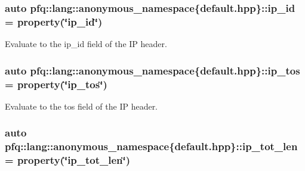 \subsubsection[{\texorpdfstring{ip\+\_\+id}{ip_id}}]{\setlength{\rightskip}{0pt plus 5cm}auto pfq\+::lang\+::anonymous\+\_\+namespace\{default.\+hpp\}\+::ip\+\_\+id = {\bf property}(\char`\"{}ip\+\_\+id\char`\"{})}\hypertarget{namespacepfq_1_1lang_1_1anonymous__namespace_02default_8hpp_03_a87620275a9e9760978d5660be0582852}{}\label{namespacepfq_1_1lang_1_1anonymous__namespace_02default_8hpp_03_a87620275a9e9760978d5660be0582852}


Evaluate to the {\ttfamily ip\+\_\+id} field of the IP header. 

\subsubsection[{\texorpdfstring{ip\+\_\+tos}{ip_tos}}]{\setlength{\rightskip}{0pt plus 5cm}auto pfq\+::lang\+::anonymous\+\_\+namespace\{default.\+hpp\}\+::ip\+\_\+tos = {\bf property}(\char`\"{}ip\+\_\+tos\char`\"{})}\hypertarget{namespacepfq_1_1lang_1_1anonymous__namespace_02default_8hpp_03_acc5d2b786c39d4177ab37ee16ee2295d}{}\label{namespacepfq_1_1lang_1_1anonymous__namespace_02default_8hpp_03_acc5d2b786c39d4177ab37ee16ee2295d}


Evaluate to the {\ttfamily tos} field of the IP header. 

\subsubsection[{\texorpdfstring{ip\+\_\+tot\+\_\+len}{ip_tot_len}}]{\setlength{\rightskip}{0pt plus 5cm}auto pfq\+::lang\+::anonymous\+\_\+namespace\{default.\+hpp\}\+::ip\+\_\+tot\+\_\+len = {\bf property}(\char`\"{}ip\+\_\+tot\+\_\+len\char`\"{})}\hypertarget{namespacepfq_1_1lang_1_1anonymous__namespace_02default_8hpp_03_a48d42ce1bea31f55be3377e8f2c41bbe}{}\label{namespacepfq_1_1lang_1_1anonymous__namespace_02default_8hpp_03_a48d42ce1bea31f55be3377e8f2c41bbe}


